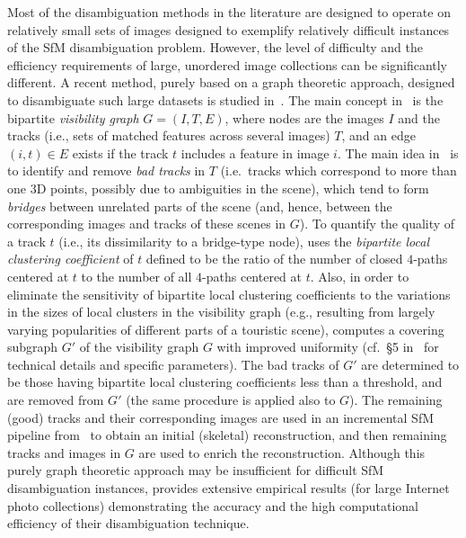 \documentclass[10pt]{article}
\begin{document}
Most of the disambiguation methods in the literature are designed to operate on relatively small sets of images designed to exemplify relatively difficult instances of the SfM disambiguation problem. However, the level of difficulty and the efficiency requirements of large, unordered image collections can be significantly different. A recent method, purely based on a graph theoretic approach, designed to disambiguate such large datasets is studied in~\cite{WilsonSnavelyDisambig}. The main concept in~\cite{WilsonSnavelyDisambig} is the bipartite \textit{visibility graph} $G = (I,T,E)$, where nodes are the images $I$ and the tracks (i.e., sets of matched features across several images) $T$, and an edge $(i, t)\in E$ exists if the track $t$ includes a feature in image $i$. The main idea in~\cite{WilsonSnavelyDisambig} is to identify and remove \textit{bad tracks} in $T$ (i.e.~tracks which correspond to more than one $3$D points, possibly due to ambiguities in the scene), which tend to form \textit{bridges} between unrelated parts of the scene (and, hence, between the corresponding images and tracks of these scenes in $G$). To quantify the quality of a track $t$ (i.e., its dissimilarity to a bridge-type node), \cite{WilsonSnavelyDisambig} uses the \textit{bipartite local clustering coefficient} of $t$ defined to be the ratio of the number of closed $4$-paths centered at $t$ to the number of all $4$-paths centered at $t$. Also, in order to eliminate the sensitivity of bipartite local clustering coefficients to the variations in the sizes of local clusters in the visibility graph (e.g., resulting from largely varying popularities of different parts of a touristic scene), \cite{WilsonSnavelyDisambig} computes a covering subgraph $G'$ of the visibility graph $G$ with improved uniformity (cf.~\S5 in~\cite{WilsonSnavelyDisambig} for technical details and specific parameters). The bad tracks of $G'$ are determined to be those having bipartite local clustering coefficients less than a threshold, and are removed from $G'$ (the same procedure is applied also to $G$). The remaining (good) tracks and their corresponding images are used in an incremental SfM pipeline from~\cite{SnavelyRome} to obtain an initial (skeletal) reconstruction, and then remaining tracks and images in $G$ are used to enrich the reconstruction. Although this purely graph theoretic approach may be insufficient for difficult SfM disambiguation instances, \cite{WilsonSnavelyDisambig} provides extensive empirical results (for large Internet photo collections) demonstrating the accuracy and the high computational efficiency of their disambiguation technique.
\end{document}
